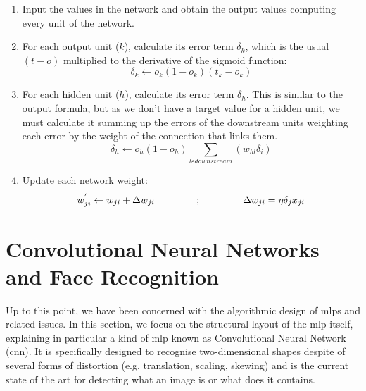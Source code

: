 		\begin{enumerate}
			\item Input the values in the network and obtain the output values computing every unit of the network.
			\item For each output unit ($k$), calculate its error term $\delta_k$, which is the usual $(t-o)$ multiplied to the derivative of the sigmoid function:
				\begin{equation}
					\label{backpropagation_output_error}
					\delta_k \leftarrow o_k (1 - o_k)(t_k - o_k)
				\end{equation}				

			\item For each hidden unit ($h$), calculate its error term $\delta_h$. This is similar to the output formula, but as we don't have a target value for a hidden unit, we must calculate it summing up the errors of the downstream units weighting each error by the weight of the connection that links them. 
				\begin{equation}
					\label{backpropagation_hidden_error}
					\delta_h \leftarrow o_h (1 - o_h) \sum_{l \varepsilon downstream} (w_{hl} \delta_i)
				\end{equation}

			\item Update each network weight:
				\begin{equation}
					\label{backpropagation_weight_update}
					w^{'}_{ji} \leftarrow w_{ji} + \Delta w_{ji} \hspace{1.5cm} ; \hspace{1.5cm} \Delta w_{ji} = \eta \delta_j x_{ji}
				\end{equation}
		\end{enumerate} 




\section{Convolutional Neural Networks and Face Recognition}
Up to this point, we have been concerned with the algorithmic design of \glspl{mlp} and related issues. In this section, we focus on the structural layout of the \gls{mlp} itself, explaining in particular a kind of \gls{mlp} known as Convolutional Neural Network (\gls{cnn}). It is specifically designed to recognise two-dimensional shapes despite of several forms of distortion (e.g. translation, scaling, skewing) and is the current state of the art for detecting what an image is or what does it contains.

